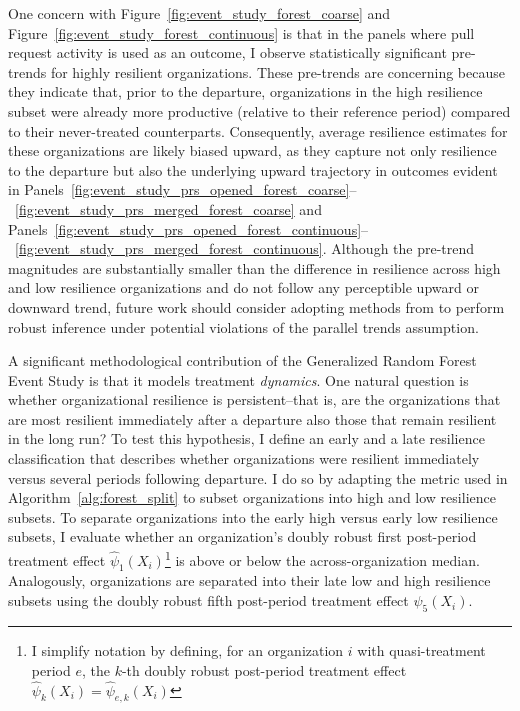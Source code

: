 \documentclass[12pt,notitlepage]{article}
\begin{document}

One concern with Figure~\ref{fig:event_study_forest_coarse} and Figure~\ref{fig:event_study_forest_continuous} is that in the panels where pull request activity is used as an outcome, I observe statistically significant pre-trends for highly resilient organizations. 
These pre-trends are concerning because they indicate that, prior to the departure, organizations in the high resilience subset were already more productive (relative to their reference period) compared to their never-treated counterparts. 
Consequently, average resilience estimates for these organizations are likely biased upward, as they capture not only resilience to the departure but also the underlying upward trajectory in outcomes evident in Panels~\ref{fig:event_study_prs_opened_forest_coarse}--~\ref{fig:event_study_prs_merged_forest_coarse} and Panels~\ref{fig:event_study_prs_opened_forest_continuous}--~\ref{fig:event_study_prs_merged_forest_continuous}.
Although the pre-trend magnitudes are substantially smaller than the difference in resilience across high and low resilience organizations and do not follow any perceptible upward or downward trend, future work should consider adopting methods from \cite{rambachan_pt_2022} to perform robust inference under potential violations of the parallel trends assumption. 


A significant methodological contribution of the Generalized Random Forest Event Study is that it models treatment \textit{dynamics}.
One natural question is whether organizational resilience is persistent--that is, are the organizations that are most resilient immediately after a departure also those that remain resilient in the long run?
To test this hypothesis, I define an early and a late resilience classification that describes whether organizations were resilient immediately versus several periods following departure.
I do so by adapting the metric used in Algorithm~\ref{alg:forest_split} to subset organizations into high and low resilience subsets.
To separate organizations into the early high versus early low resilience subsets, I evaluate whether an organization's doubly robust first post-period treatment effect $\hat{\psi}_{1}(X_i)$\footnote{I simplify notation by defining, for an organization $i$ with quasi-treatment period $e$, the $k$-th doubly robust post-period treatment effect $\hat{\psi}_{k}(X_i) = \hat{\psi}_{e,k}(X_i)$} is above or below the across-organization median. 
Analogously, organizations are separated into their late low and high resilience subsets using the doubly robust fifth post-period treatment effect $\hat{\psi}_{5}(X_i)$.
\end{document}
